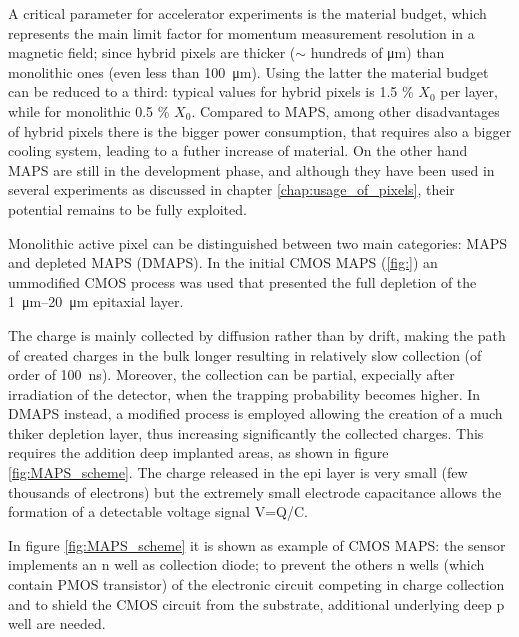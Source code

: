    A critical parameter for accelerator experiments is the material budget, which represents the main limit factor for momentum measurement resolution in a magnetic field; since hybrid pixels are thicker ($\sim$ hundreds of \si{\um}) than monolithic ones (even less than \SI{100}{\um}). Using the latter the material budget can be reduced to a third: typical values for hybrid pixels is 1.5 \% $X_0$ per layer, while for monolithic 0.5 \% $X_0$. Compared to MAPS, among other disadvantages of hybrid pixels there is the bigger power consumption, that requires also a bigger cooling system, leading to a futher increase of material.
   On the other hand MAPS are still in the development phase, and although they have been used in several experiments as discussed in chapter \ref{chap:usage_of_pixels}, their potential remains to be fully exploited.

   Monolithic active pixel can be distinguished between two main categories: MAPS and depleted MAPS (DMAPS).
   In the initial CMOS MAPS (\ref{fig:}) an ummodified CMOS process was used that presented the full depletion of the \SIrange{1}{20}{\um} epitaxial layer.

   The charge is mainly collected by diffusion rather than by drift, making the path of created charges in the bulk longer resulting in relatively slow collection (of order of \SI{100}{ns}). 
   Moreover, the collection can be partial, expecially after irradiation of the detector, when the trapping probability becomes higher. 
   In DMAPS instead, a modified process is employed allowing the creation of a much thiker depletion layer, thus increasing significantly the collected charges. This requires the addition deep implanted areas, as shown in figure \ref{fig:MAPS_scheme}. The charge released in the epi layer is very small (few thousands of electrons) but the extremely small electrode capacitance allows the formation of a detectable voltage signal V=Q/C.
   
   In figure \ref{fig:MAPS_scheme} it is shown as example of CMOS MAPS: the sensor implements an n well as collection diode; to prevent the others n wells (which contain PMOS transistor) of the electronic circuit competing in charge collection and to shield the CMOS circuit from the substrate, additional underlying deep p well are needed.
   

